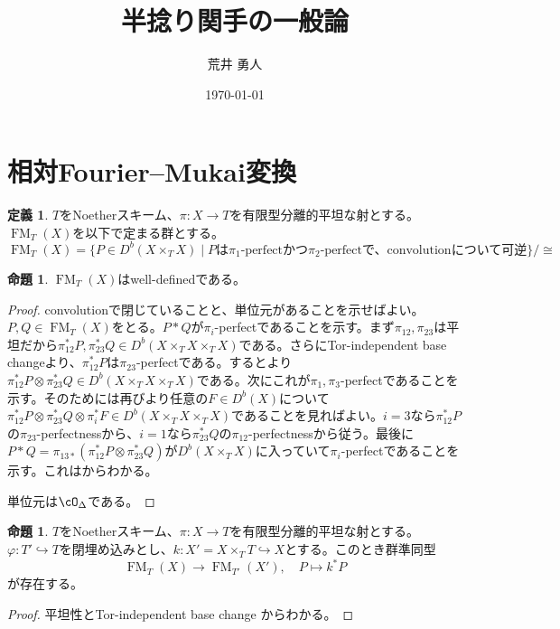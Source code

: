 \documentclass[uplatex, a4paper, dvipdfmx]{jsarticle}
\title{半捻り関手の一般論}
\author{荒井 勇人}
\date{\today}
\theoremstyle{definition}
\newtheorem{definition}[theorem]{定義}
\newtheorem{proposition}[theorem]{命題}
\DeclareMathOperator{\FM}{\mathrm{FM}}
\begin{document}
\maketitle
\section{相対Fourier--Mukai変換}
\begin{definition}
    $T$をNoetherスキーム、$\pi \colon X \to T$を有限型分離的平坦な射とする。
    $\FM_T(X)$を以下で定まる群とする。
    \begin{equation}
        \FM_T(X) = \{P \in D^b(X \times_T X) \mid P \text{は$\pi_1$-perfectかつ$\pi_2$-perfectで、convolutionについて可逆}\}/\cong
    \end{equation}
\end{definition}
\begin{proposition}
    $\FM_T(X)$はwell-definedである。
\end{proposition}
\begin{proof}
    convolutionで閉じていることと、単位元があることを示せばよい。
    $P, Q \in \FM_T(X)$をとる。$P*Q$が$\pi_i$-perfectであることを示す。まず$\pi_{12}, \pi_{23}$は平坦だから$\pi_{12}^*P, \pi_{23}^*Q \in D^b(X \times_T X \times_T X)$である。さらにTor-independent base changeより、$\pi_{12}^*P$は$\pi_{23}$-perfectである。すると\cite[Lemma 5.1]{MR3720794}より$\pi_{12}^*P \otimes \pi_{23}^*Q \in D^b(X \times_T X \times_T X)$である。次にこれが$\pi_1, \pi_3$-perfectであることを示す。そのためには再び\cite[Lemma 5.1]{MR3720794}より任意の$F \in D^b(X)$について$\pi_{12}^*P \otimes \pi_{23}^*Q \otimes \pi_i^*F \in D^b(X \times_T X \times_T X)$であることを見ればよい。$i=3$なら$\pi_{12}^*P$の$\pi_{23}$-perfectnessから、$i=1$なら$\pi_{23}^*Q$の$\pi_{12}$-perfectnessから従う。最後に$P * Q = \pi_{13*}(\pi_{12}^*P \otimes \pi_{23}^*Q)$が$D^b(X\times_T X)$に入っていて$\pi_{i}$-perfectであることを示す。これは\cite[Proposition 2.7]{MR3720794}からわかる。

    単位元は$\cO_\Delta$である。
\end{proof}

\begin{proposition}
    $T$をNoetherスキーム、$\pi \colon X \to T$を有限型分離的平坦な射とする。$\varphi \colon T' \hookrightarrow T$を閉埋め込みとし、$k \colon X' = X \times_T T \hookrightarrow X$とする。このとき群準同型
    \begin{equation}
        \FM_T(X) \to \FM_{T'}(X'), \quad P \mapsto k^*P
    \end{equation}
    が存在する。
\end{proposition}
\begin{proof}
    平坦性とTor-independent base change からわかる。
\end{proof}
\end{document}

